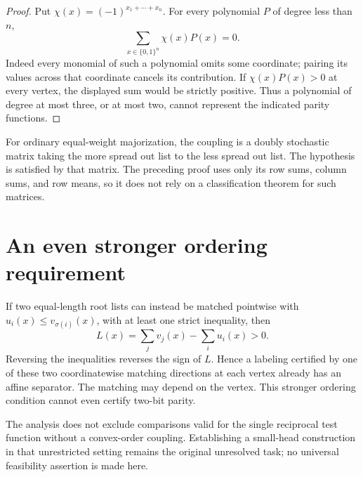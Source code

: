 \documentclass[11pt]{article}
\newcommand{\Qn}{\{0,1\}^n}
\begin{document}
\begin{proof}
Put $\chi(x)=(-1)^{x_1+\cdots+x_n}$. For every polynomial $P$ of
degree less than $n$,
\[
                         \sum_{x\in\Qn}\chi(x)P(x)=0.
\]
Indeed every monomial of such a polynomial omits some coordinate;
pairing its values across that coordinate cancels its contribution.
If $\chi(x)P(x)>0$ at every vertex, the displayed sum would be
strictly positive. Thus a polynomial of degree at most three, or
at most two, cannot represent the indicated parity functions.
\end{proof}

For ordinary equal-weight majorization, the coupling is a doubly
stochastic matrix taking the more spread out list to the less spread
out list. The hypothesis is satisfied by that matrix. The preceding
proof uses only its row sums, column sums, and row means, so it does
not rely on a classification theorem for such matrices.

\section{An even stronger ordering requirement}

If two equal-length root lists can instead be matched pointwise with
$u_i(x)\le v_{\sigma(i)}(x)$, with at least one strict inequality,
then
\[
                        L(x)=\sum_jv_j(x)-\sum_i u_i(x)>0.
\]
Reversing the inequalities reverses the sign of $L$. Hence a labeling
certified by one of these two coordinatewise matching directions at
each vertex already has an affine separator. The matching may depend
on the vertex. This stronger ordering condition cannot even certify
two-bit parity.

The analysis does not exclude comparisons valid for the single
reciprocal test function without a convex-order coupling. Establishing
a small-head construction in that unrestricted setting remains the
original unresolved task; no universal feasibility assertion is made
here.
\end{document}

